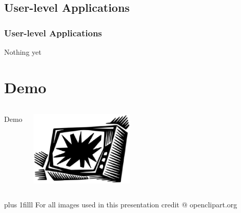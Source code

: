 \documentclass{beamer}
\begin{document}
\begin{frame}
\begin{columns}[C]
{\begin{column}{5cm}
      \end{column}
    }
\end{columns}
\end{frame}

\subsection{User-level Applications}
\begin{frame}
\frametitle{User-level Applications}
\begin{center}
  Nothing yet
\end{center}
\end{frame}

\section{Demo}
\begin{frame}
  \begin{columns}[C]
    \column{5cm}
    \begin{center}
      Demo
    \end{center}
    \includegraphics[width=5cm]{images/liftarn_Smashed_TV.eps}  
  \end{columns}
  \vskip0pt plus 1filll
  \tiny{For all images used in this presentation credit @ openclipart.org}
\end{frame}
\end{document}
